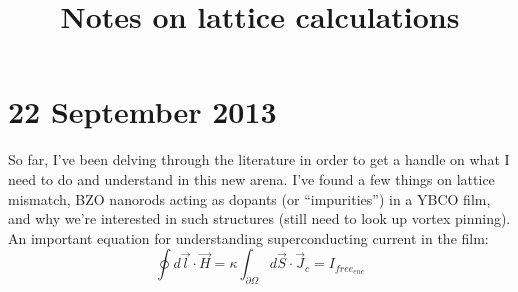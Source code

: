 \documentclass{revtex4}
\begin{document}
\title{Notes on lattice calculations}
\section{22 September 2013}
So far, I've been delving through the literature in order to get a handle on what I need to do and understand in this new arena. I've found a few things on lattice mismatch, BZO nanorods acting as dopants (or ``impurities'') in a YBCO film, and why we're interested in such structures (still need to look up vortex pinning).\\

An important equation for understanding superconducting current in the film:\\
\begin{equation}
\oint d\vec{l}\cdot\vec{H} = \kappa\int_{\partial\Omega}d\vec{S}\cdot\vec{J}_c = I_{free_{enc}}
\end{equation}
\end{document}
